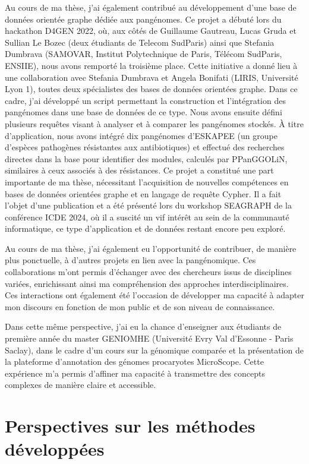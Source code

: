 Au cours de ma thèse, j’ai également contribué au développement d’une base de données orientée graphe dédiée aux pangénomes. Ce projet a débuté lors du hackathon D4GEN 2022, où, aux côtés de Guillaume Gautreau, Lucas Gruda et Sullian Le Bozec (deux étudiants de Telecom SudParis) ainsi que Stefania Dumbrava (SAMOVAR, Institut Polytechnique de Paris, Télécom SudParis, ENSIIE), nous avons remporté la troisième place. Cette initiative a donné lieu à une collaboration avec Stefania Dumbrava et Angela Bonifati (LIRIS, Université Lyon 1), toutes deux spécialistes des bases de données orientées graphe. Dans ce cadre, j’ai développé un script permettant la construction et l’intégration des pangénomes dans une base de données de ce type. Nous avons ensuite défini plusieurs requêtes visant à analyser et à comparer les pangénomes stockés. À titre d’application, nous avons intégré dix pangénomes d’ESKAPEE (un groupe d’espèces pathogènes résistantes aux antibiotiques) et effectué des recherches directes dans la base pour identifier des modules, calculés par PPanGGOLiN, similaires à ceux associés à des résistances. Ce projet a constitué une part importante de ma thèse, nécessitant l’acquisition de nouvelles compétences en bases de données orientées graphe et en langage de requête Cypher. Il a fait l’objet d’une publication et a été présenté lors du workshop SEAGRAPH de la conférence ICDE 2024, où il a suscité un vif intérêt au sein de la communauté informatique, ce type d’application et de données restant encore peu exploré.

Au cours de ma thèse, j’ai également eu l’opportunité de contribuer, de manière plus ponctuelle, à d’autres projets en lien avec la pangénomique. Ces collaborations m’ont permis d’échanger avec des chercheurs issus de disciplines variées, enrichissant ainsi ma compréhension des approches interdisciplinaires. Ces interactions ont également été l’occasion de développer ma capacité à adapter mon discours en fonction de mon public et de son niveau de connaissance.

Dans cette même perspective, j’ai eu la chance d’enseigner aux étudiants de première année du master GENIOMHE (Université Evry Val d'Essonne - Paris Saclay), dans le cadre d’un cours sur la génomique comparée et la présentation de la plateforme d’annotation des génomes procaryotes MicroScope. Cette expérience m’a permis d’affiner ma capacité à transmettre des concepts complexes de manière claire et accessible.

\chapter{Perspectives sur les méthodes développées}

